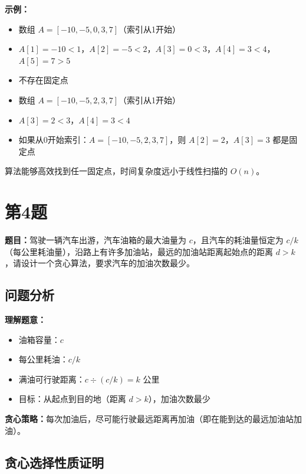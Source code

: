 \documentclass[UTF8,12pt,a4paper]{ctexart}
\begin{document}
\textbf{示例：}
\begin{itemize}
	\item 数组 $A = [-10, -5, 0, 3, 7]$（索引从1开始）
	\item $A[1] = -10 < 1$，$A[2] = -5 < 2$，$A[3] = 0 < 3$，$A[4] = 3 < 4$，$A[5] = 7 > 5$
	\item 不存在固定点
\end{itemize}

\begin{itemize}
	\item 数组 $A = [-10, -5, 2, 3, 7]$（索引从1开始）
	\item $A[3] = 2 < 3$，$A[4] = 3 < 4$
	\item 如果从0开始索引：$A = [-10, -5, 2, 3, 7]$，则 $A[2] = 2$，$A[3] = 3$ 都是固定点
\end{itemize}

算法能够高效找到任一固定点，时间复杂度远小于线性扫描的 $O(n)$。


\section*{第4题}
\textbf{题目：}驾驶一辆汽车出游，汽车油箱的最大油量为 $c$，且汽车的耗油量恒定为 $c/k$（每公里耗油量），沿路上有许多加油站，最远的加油站距离起始点的距离 $d > k$，请设计一个贪心算法，要求汽车的加油次数最少。

\subsection*{问题分析}

\textbf{理解题意：}
\begin{itemize}
	\item 油箱容量：$c$
	\item 每公里耗油：$c/k$
	\item 满油可行驶距离：$c \div (c/k) = k$ 公里
	\item 目标：从起点到目的地（距离 $d > k$），加油次数最少
\end{itemize}

\textbf{贪心策略：}每次加油后，尽可能行驶最远距离再加油（即在能到达的最远加油站加油）。

\subsection*{贪心选择性质证明}
\end{document}

